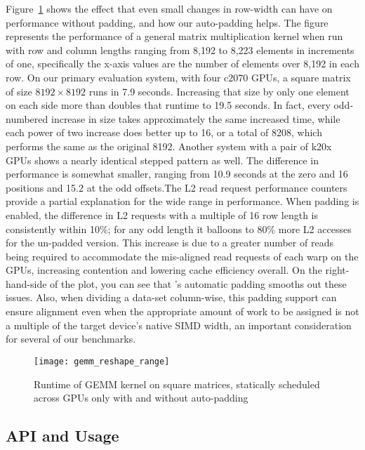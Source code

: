 Figure~\ref{fig:reshape} shows the effect that even small changes in row-width
can have on performance without padding, and how our auto-padding helps.  The
figure represents the performance of a general matrix multiplication kernel
when run with row and column lengths ranging from 8,192 to 8,223 elements in
increments of one, specifically the x-axis values are the number of elements
over 8,192 in each row.  On our primary evaluation system, with four c2070
GPUs, a square matrix of size $8192\times8192$ runs in 7.9 seconds.
Increasing that size by only one element on each side more than doubles that
runtime to 19.5 seconds.  In fact, every odd-numbered increase in size takes
approximately the same increased time, while each power of two increase does
better up to 16, or a total of 8208, which performs the same as the original
8192.  Another system with a pair of k20x GPUs shows a nearly identical
stepped pattern as well.  The difference in performance is somewhat smaller,
ranging from 10.9 seconds at the zero and 16 positions and 15.2 at the odd
offsets.The L2 read request performance counters provide a partial explanation
for the wide range in performance.  When padding is enabled, the difference in
L2 requests with a multiple of 16 row length is consistently within 10\%; for
any odd length it balloons to 80\% more L2 accesses for the un-padded version.
This increase is due to a greater number of reads being required to
accommodate the mis-aligned read requests of each warp on the GPUs, increasing
contention and lowering cache efficiency overall.  On the right-hand-side of
the plot, you can see that \tsar's automatic padding smooths out these issues.
Also, when dividing a data-set column-wise, this padding support can ensure
alignment even when the appropriate amount of work to be assigned is not a
multiple of the target device's native SIMD width, an important consideration
for several of our benchmarks.

\begin{figure}[t]
        \texttt{[image: gemm\_reshape\_range]}
        \caption{Runtime of GEMM kernel on square matrices, statically
          scheduled across GPUs only with and without auto-padding}
        \label{fig:reshape}
\end{figure}


\subsection{\tsar API and Usage}
\label{sec:using}
\label{sec:api}

